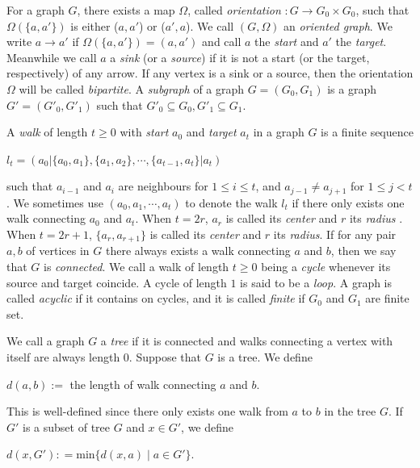 \documentclass[a4paper,12pt]{amsart}
\begin{document}
For a graph $G$, there exists a map $\Omega$, called \textit{orientation}  $:G \rightarrow G_0\times G_0$, such that $\Omega(\{a, a'\})$ is either ($a, a'$) or ($a', a$). We call $(G, \Omega)$  an \textit{oriented graph}. We  write $a\rightarrow a'$ if $\Omega(\{a, a'\})=(a, a')$ and call $a$ the \textit{start} and $a'$ the \textit{target}. Meanwhile we call $a$   a \textit{sink} (or a \textit{source}) if it is not a start (or the target, respectively) of any arrow. If any vertex is a sink or a source, then the orientation  $\Omega$ will be called \textit{bipartite}. A \textit{subgraph}    of a  graph $G=(G_0,G_1)$ is a graph  $G'=(G'_0,G'_1)$ such that $G'_0\subseteq G_0, G'_1\subseteq G_1$.


A  \textit{walk} of length $t\geq 0$ with \textit{start} $a_0$ and \textit{target} $a_t$ in a graph $G$ is a finite sequence 
\begin{center}
$l_t=(a_0|\{a_0,a_1\},\{a_1,a_2\},\cdots,\{a_{t-1},a_t\}|a_t)$
\end{center}
such that   $a_{i-1}$ and $a_i$ are neighbours for $1\leq i\leq t$, and $a_{j-1}\neq a_{j+1}$ for $1\leq j < t$. We sometimes use $(a_0,a_1,\cdots, a_t)$ to denote the walk $l_t$ if there only exists one walk connecting $a_0$ and $a_t$. When $t=2r$,   $a_r$ is called its \textit{center} and $r$ its \textit{radius} \cite[2.1]{Claus}. When $t=2r+1$,  $\{a_r, a_{r+1}\}$ is called its \textit{center} and $r$ its \textit{radius}. If for any pair $a, b$ of vertices in $G$ there always exists a walk connecting $a$ and $b$, then we say that $G$ is \textit{connected}. We call a walk of length $t \geq 0$ being a \textit{cycle} whenever its source and target coincide. A cycle of length $1$ is said to be a \textit{loop}. A graph is called \textit{acyclic} if it contains on cycles,  and it is called \textit{finite} if $G_0$ and $G_1$ are finite set.

We call a graph $G$  a \textit{tree} if it is connected and walks connecting a vertex with itself are always length 0. Suppose that $G$ is a tree.  We define

\begin{center}
$d(a, b):=$ the length of walk connecting $a$ and $b$.
\end{center} 
This is well-defined since there  only exists one walk from $a$ to $b$ in the tree $G$. If $G'$ is a subset of tree $G$ and $x\in G'$, we define

\begin{center}
$d(x, G'): =$min$\{d(x, a)\mid a \in G'\}$.
\end{center}
\end{document}
